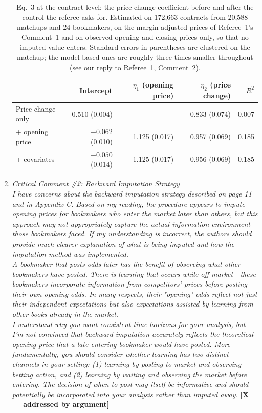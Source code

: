 \documentclass[letterpaper,12pt]{article}
\newcounter{b}
\newcommand{\argX}{\textcolor{green!55!black}{\textbf{[X --- addressed by argument]}}}
\begin{document}
\begin{enumerate}
{\begin{table}[H]
\centering
\caption{Eq.~3 at the contract level: the price-change coefficient before and after the control the referee asks for. Estimated on 172,663 contracts from 20,588 matchups and 24 bookmakers, on the margin-adjusted prices of Referee~1's Comment~1 and on observed opening and closing prices only, so that no imputed value enters. Standard errors in parentheses are clustered on the matchup; the model-based ones are roughly three times smaller throughout (see our reply to Referee~1, Comment~2).}
\label{tab:r2c1}
\small
\setlength{\tabcolsep}{4pt}
\begin{tabular}{lrrrr}
\toprule
 & Intercept & $\eta_1$ (opening price) & $\eta_2$ (price change) & $R^2$ \\
\midrule
Price change only    & 0.510 (0.004)    & ---           & 0.833 (0.074) & 0.007 \\
\quad + opening price & $-0.062$ (0.010) & 1.125 (0.017) & 0.957 (0.069) & 0.185 \\
\quad + covariates    & $-0.050$ (0.014) & 1.125 (0.017) & 0.956 (0.069) & 0.185 \\
\bottomrule
\end{tabular}
\end{table}
}

\item \textit{Critical Comment \#2: Backward Imputation Strategy\\[6pt]
I have concerns about the backward imputation strategy described on page 11 and in Appendix C. Based on my reading, the procedure appears to impute opening prices for bookmakers who enter the market later than others, but this approach may not appropriately capture the actual information environment those bookmakers faced. If my understanding is incorrect, the authors should provide much clearer explanation of what is being imputed and how the imputation method was implemented.\\[6pt]
A bookmaker that posts odds later has the benefit of observing what other bookmakers have posted. There is learning that occurs while off-market—these bookmakers incorporate information from competitors' prices before posting their own opening odds. In many respects, their "opening" odds reflect not just their independent expectations but also expectations assisted by learning from other books already in the market.\\[6pt]
I understand why you want consistent time horizons for your analysis, but I'm not convinced that backward imputation accurately reflects the theoretical opening price that a late-entering bookmaker would have posted. More fundamentally, you should consider whether learning has two distinct channels in your setting: (1) learning by posting to market and observing betting action, and (2) learning by waiting and observing the market before entering. The decision of when to post may itself be informative and should potentially be incorporated into your analysis rather than imputed away.} \argX


\end{enumerate}
\end{document}
